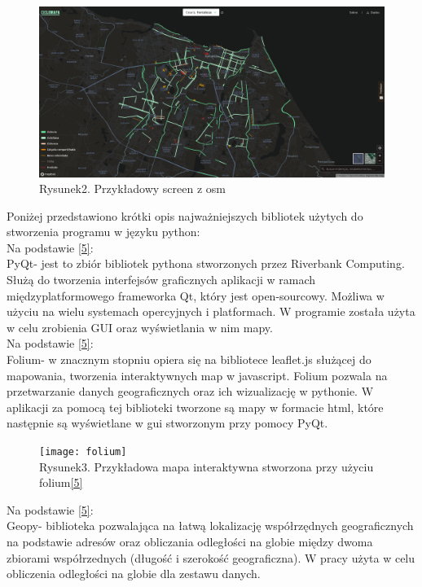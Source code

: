 \documentclass[a4paper, twoside, 12pt, justified]{article}
\begin{document}
 	\begin{figure}[h]
 	\includegraphics[scale=0.23]{osm_example}
 	\centering
 	\\
 	{Rysunek2. Przykładowy screen z osm}
	\end{figure}
	 
	 Poniżej przedstawiono krótki opis najważniejszych bibliotek użytych do stworzenia programu w języku python: \\
	 
	 
	 Na podstawie \hyperlink{pyqt}{[5]}:\\
	 PyQt- jest to zbiór bibliotek pythona stworzonych przez Riverbank Computing. Służą do tworzenia interfejsów graficznych aplikacji w ramach międzyplatformowego frameworka Qt, który jest open-sourcowy. Możliwa w użyciu na wielu systemach opercyjnych i platformach. W programie została użyta w celu zrobienia GUI oraz wyświetlania w nim mapy.\\
	 
	 
	 Na podstawie \hyperlink{folium}{[5]}:\\
	 Folium- w znacznym stopniu opiera się na bibliotece leaflet.js służącej do mapowania, tworzenia interaktywnych map w javascript. Folium pozwala na przetwarzanie danych geograficznych oraz ich wizualizację w pythonie. W aplikacji za pomocą tej biblioteki tworzone są mapy w formacie html, które następnie są wyświetlane w gui stworzonym przy pomocy PyQt.\\
	 
	 \begin{figure}[h]
	 	\texttt{[image: folium]}
	 	\centering
	 	\\
	 	{Rysunek3. Przykładowa mapa interaktywna stworzona przy użyciu folium\hyperlink{folium}{[5]}}
	 \end{figure}
	 
	 Na podstawie \hyperlink{geopy}{[5]}:\\
	 Geopy- biblioteka pozwalająca na łatwą lokalizację współrzędnych geograficznych na podstawie adresów oraz obliczania odległości na globie między dwoma zbiorami współrzednych (długość i szerokość geograficzna). W pracy użyta w celu obliczenia odległości na globie dla zestawu danych.\\
	 
\end{document}
